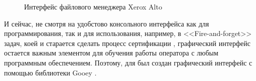 \begin{figure}[!htbp]
    \caption{Интерфейс файлового менеджера Xerox Alto \label{fig:xerox-alto-gui}}
\end{figure}


И сейчас, не смотря на удобстово консольного интерфейса как для программирования, так и для использования,
например, в <<Fire-and-forget>> задач, коей и старается сделать процесс сертификации {\ProgModule},
графический интерфейс остается важным элементом для обучения работы оператора с любым
программным обеспечением. Поэтому, для {\ProgModule} был создан графический интерфейс с помощью
библиотеки Gooey \autocite{gooey}.


